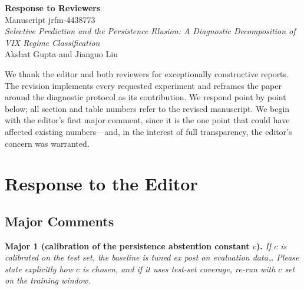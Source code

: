 \documentclass[11pt]{article}
\newenvironment{reviewer}{\color{blue!50!black}\itshape}{\normalcolor}
\begin{document}
\begin{center}
{\Large \textbf{Response to Reviewers}}\\[6pt]
Manuscript jrfm-4438773\\
\emph{Selective Prediction and the Persistence Illusion: A Diagnostic Decomposition of VIX
Regime Classification}\\[4pt]
Akshat Gupta and Jianguo Liu
\end{center}

We thank the editor and both reviewers for exceptionally constructive reports. The revision
implements every requested experiment and reframes the paper around the diagnostic protocol as
its contribution. We respond point by point below; all section and table numbers refer to the
revised manuscript. We begin with the editor's first major comment, since it is the one point
that could have affected existing numbers---and, in the interest of full transparency, the
editor's concern was warranted.

\section*{Response to the Editor}

\subsection*{Major Comments}

\textbf{Major 1 (calibration of the persistence abstention constant $c$).}
\begin{reviewer}
If $c$ is calibrated on the test set, the baseline is tuned ex post on evaluation data\ldots
Please state explicitly how $c$ is chosen, and if it uses test-set coverage, re-run with $c$
set on the training window.
\end{reviewer}
\end{document}
